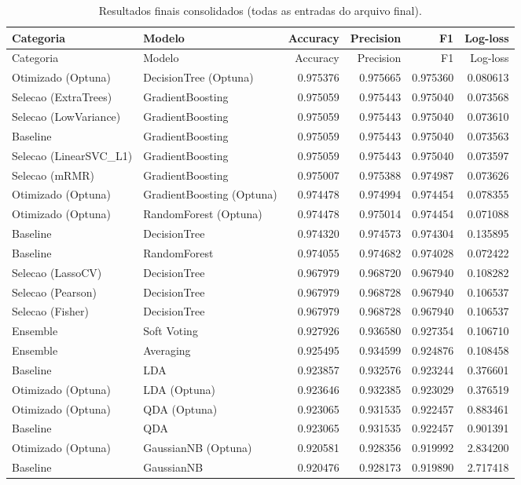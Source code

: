 \documentclass[12pt,a4paper]{article}
\begin{document}
\begin{longtable}{llrrrr}
\caption{Resultados finais consolidados (todas as entradas do arquivo final).}\\
\toprule
Categoria & Modelo & Accuracy & Precision & F1 & Log-loss \\
\midrule
\endfirsthead
\toprule
Categoria & Modelo & Accuracy & Precision & F1 & Log-loss \\
\midrule
\endhead
Otimizado (Optuna) & DecisionTree (Optuna) & 0.975376 & 0.975665 & 0.975360 & 0.080613 \\
Selecao (ExtraTrees) & GradientBoosting & 0.975059 & 0.975443 & 0.975040 & 0.073568 \\
Selecao (LowVariance) & GradientBoosting & 0.975059 & 0.975443 & 0.975040 & 0.073610 \\
Baseline & GradientBoosting & 0.975059 & 0.975443 & 0.975040 & 0.073563 \\
Selecao (LinearSVC\_L1) & GradientBoosting & 0.975059 & 0.975443 & 0.975040 & 0.073597 \\
Selecao (mRMR) & GradientBoosting & 0.975007 & 0.975388 & 0.974987 & 0.073626 \\
Otimizado (Optuna) & GradientBoosting (Optuna) & 0.974478 & 0.974994 & 0.974454 & 0.078355 \\
Otimizado (Optuna) & RandomForest (Optuna) & 0.974478 & 0.975014 & 0.974454 & 0.071088 \\
Baseline & DecisionTree & 0.974320 & 0.974573 & 0.974304 & 0.135895 \\
Baseline & RandomForest & 0.974055 & 0.974682 & 0.974028 & 0.072422 \\
Selecao (LassoCV) & DecisionTree & 0.967979 & 0.968720 & 0.967940 & 0.108282 \\
Selecao (Pearson) & DecisionTree & 0.967979 & 0.968728 & 0.967940 & 0.106537 \\
Selecao (Fisher) & DecisionTree & 0.967979 & 0.968728 & 0.967940 & 0.106537 \\
Ensemble & Soft Voting & 0.927926 & 0.936580 & 0.927354 & 0.106710 \\
Ensemble & Averaging & 0.925495 & 0.934599 & 0.924876 & 0.108458 \\
Baseline & LDA & 0.923857 & 0.932576 & 0.923244 & 0.376601 \\
Otimizado (Optuna) & LDA (Optuna) & 0.923646 & 0.932385 & 0.923029 & 0.376519 \\
Otimizado (Optuna) & QDA (Optuna) & 0.923065 & 0.931535 & 0.922457 & 0.883461 \\
Baseline & QDA & 0.923065 & 0.931535 & 0.922457 & 0.901391 \\
Otimizado (Optuna) & GaussianNB (Optuna) & 0.920581 & 0.928356 & 0.919992 & 2.834200 \\
Baseline & GaussianNB & 0.920476 & 0.928173 & 0.919890 & 2.717418 \\
\bottomrule
\end{longtable}
\end{document}
